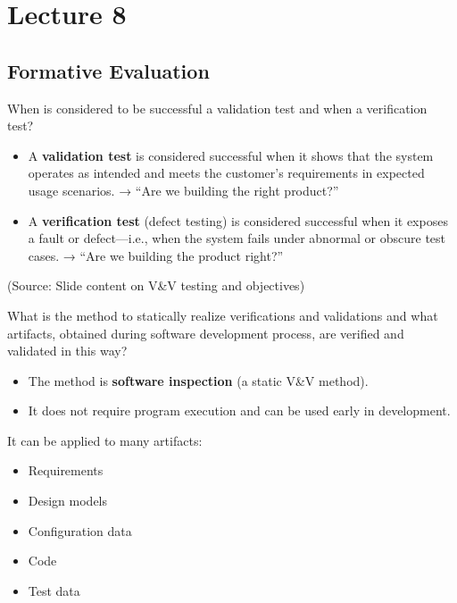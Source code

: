 \documentclass[12pt]{article}
\begin{document}
\newpage
\section{Lecture 8}

\subsection{Formative Evaluation}

\begin{questionbox}
When is considered to be successful a validation test and when a verification test?
\end{questionbox}

\begin{itemize}
    \item A \textbf{validation test} is considered successful when it shows that the system operates as intended and meets the customer's requirements in expected usage scenarios. → ``Are we building the right product?''
    \item A \textbf{verification test} (defect testing) is considered successful when it exposes a fault or defect—i.e., when the system fails under abnormal or obscure test cases. → ``Are we building the product right?''
\end{itemize}

(Source: Slide content on V\&V testing and objectives)

\begin{questionbox}
What is the method to statically realize verifications and validations and what artifacts, obtained during software development process, are verified and validated in this way?
\end{questionbox}

\begin{itemize}
    \item The method is \textbf{software inspection} (a static V\&V method).
    \item It does not require program execution and can be used early in development.
\end{itemize}

It can be applied to many artifacts:
\begin{itemize}
    \item Requirements
    \item Design models
    \item Configuration data
    \item Code
    \item Test data
\end{itemize}
\end{document}
